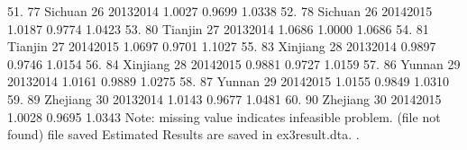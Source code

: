  51. {\VBAR}  77        Sichuan   26   2013{\tytilde}2014   1.0027   0.9699   1.0338 {\VBAR}
 52. {\VBAR}  78        Sichuan   26   2014{\tytilde}2015   1.0187   0.9774   1.0423 {\VBAR}
 53. {\VBAR}  80        Tianjin   27   2013{\tytilde}2014   1.0686   1.0000   1.0686 {\VBAR}
 54. {\VBAR}  81        Tianjin   27   2014{\tytilde}2015   1.0697   0.9701   1.1027 {\VBAR}
 55. {\VBAR}  83       Xinjiang   28   2013{\tytilde}2014   0.9897   0.9746   1.0154 {\VBAR}
 56. {\VBAR}  84       Xinjiang   28   2014{\tytilde}2015   0.9881   0.9727   1.0159 {\VBAR}
 57. {\VBAR}  86         Yunnan   29   2013{\tytilde}2014   1.0161   0.9889   1.0275 {\VBAR}
 58. {\VBAR}  87         Yunnan   29   2014{\tytilde}2015   1.0155   0.9849   1.0310 {\VBAR}
 59. {\VBAR}  89       Zhejiang   30   2013{\tytilde}2014   1.0143   0.9677   1.0481 {\VBAR}
 60. {\VBAR}  90       Zhejiang   30   2014{\tytilde}2015   1.0028   0.9695   1.0343 {\VBAR}
     {\BLC}
Note: missing value indicates infeasible problem.
(file{} not found)
file{} saved
{\smallskip}
Estimated Results are saved in ex3result.dta.
{\smallskip}
. 
